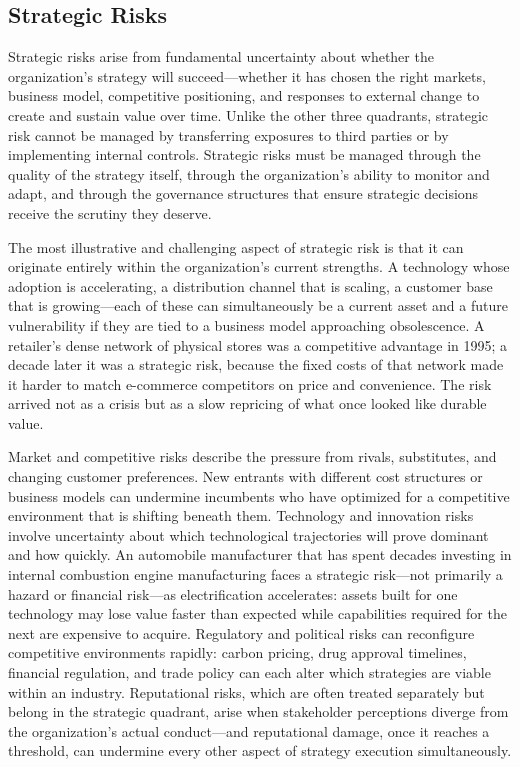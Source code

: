 \documentclass[11pt,openany]{book}
\begin{document}
\subsection{Strategic Risks}
\label{subsec:strategic-risks}

Strategic risks arise from fundamental uncertainty about whether the organization's strategy will succeed---whether it has chosen the right markets, business model, competitive positioning, and responses to external change to create and sustain value over time. Unlike the other three quadrants, strategic risk cannot be managed by transferring exposures to third parties or by implementing internal controls. Strategic risks must be managed through the quality of the strategy itself, through the organization's ability to monitor and adapt, and through the governance structures that ensure strategic decisions receive the scrutiny they deserve.

The most illustrative and challenging aspect of strategic risk is that it can originate entirely within the organization's current strengths. A technology whose adoption is accelerating, a distribution channel that is scaling, a customer base that is growing---each of these can simultaneously be a current asset and a future vulnerability if they are tied to a business model approaching obsolescence. A retailer's dense network of physical stores was a competitive advantage in 1995; a decade later it was a strategic risk, because the fixed costs of that network made it harder to match e-commerce competitors on price and convenience. The risk arrived not as a crisis but as a slow repricing of what once looked like durable value.

Market and competitive risks describe the pressure from rivals, substitutes, and changing customer preferences. New entrants with different cost structures or business models can undermine incumbents who have optimized for a competitive environment that is shifting beneath them. Technology and innovation risks involve uncertainty about which technological trajectories will prove dominant and how quickly. An automobile manufacturer that has spent decades investing in internal combustion engine manufacturing faces a strategic risk---not primarily a hazard or financial risk---as electrification accelerates: assets built for one technology may lose value faster than expected while capabilities required for the next are expensive to acquire. Regulatory and political risks can reconfigure competitive environments rapidly: carbon pricing, drug approval timelines, financial regulation, and trade policy can each alter which strategies are viable within an industry. Reputational risks, which are often treated separately but belong in the strategic quadrant, arise when stakeholder perceptions diverge from the organization's actual conduct---and reputational damage, once it reaches a threshold, can undermine every other aspect of strategy execution simultaneously.
\end{document}
